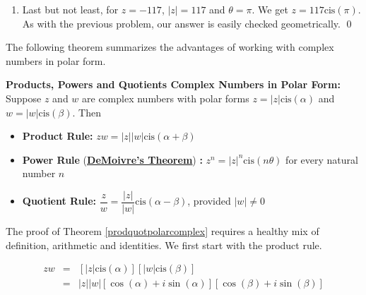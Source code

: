 \begin{ex}
\begin{enumerate}
\begin{enumerate}
\item  Last but not least, for $z = -117$, $|z| = 117$ and $\theta = \pi$. We get $z = 117 \text{cis}(\pi)$. As with the previous problem, our answer is easily checked geometrically. \qed

\end{enumerate}

\end{enumerate}

\end{ex}

The following theorem summarizes the advantages of working with complex numbers in polar form.

\medskip

\colorbox{ResultColor}{\bbm

\begin{thm} \label{prodquotpolarcomplex} \textbf{Products, Powers and Quotients Complex Numbers in Polar Form:}  Suppose $z$ and $w$ are complex numbers with polar forms $z = |z|\text{cis}(\alpha)$ and $w = |w|\text{cis}(\beta)$.  Then

\begin{itemize}

\item  \textbf{Product Rule:} $zw = |z||w| \text{cis}(\alpha + \beta)$ 

\item  \textbf{Power Rule} (\textbf{\href{http://en.wikipedia.org/wiki/Abraham_de_Moivre}{\underline{DeMoivre's Theorem}}}) \textbf{:}  $z^{n} = |z|^{n} \text{cis}(n \theta)$ for every natural number $n$ 

\item  \textbf{Quotient Rule:} $\dfrac{z}{w} = \dfrac{|z|}{|w|} \text{cis}(\alpha - \beta)$, provided $|w| \neq 0$ 

\end{itemize}

\end{thm}

\ebm}

\medskip

The proof of Theorem \ref{prodquotpolarcomplex} requires a healthy mix of definition, arithmetic and identities.  We first start with the product rule.

\[ \begin{array}{rcl}

zw & = & \left[|z|\text{cis}(\alpha)\right] \left[|w|\text{cis}(\beta)\right]  \\[3pt]
   & = & |z||w|\left[\cos(\alpha) + i\sin(\alpha)\right]\left[\cos(\beta) + i \sin(\beta)\right] \\ \end{array} \]

